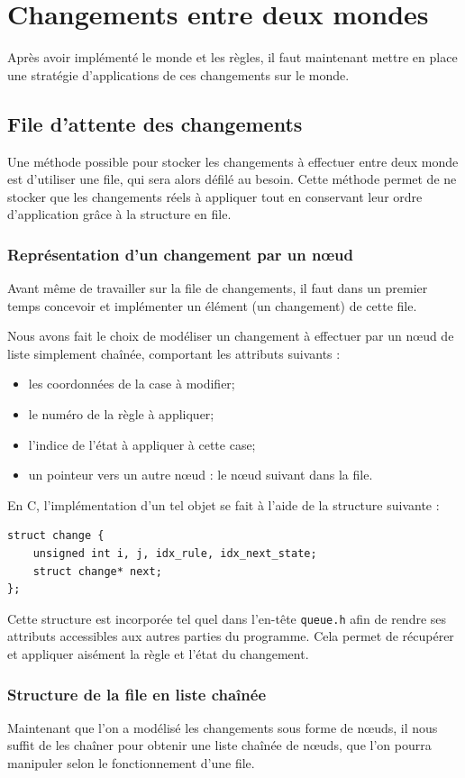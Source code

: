 \chapter{Changements entre deux mondes}
\graphicspath{{img/chap3}}
Après avoir implémenté le monde et les règles, il faut maintenant mettre en place une stratégie d'applications de ces changements sur le monde. 
\section{File d'attente des changements}
Une méthode possible pour stocker les changements à effectuer entre deux monde est d'utiliser une file, qui sera alors défilé au besoin. Cette méthode permet de ne stocker que les changements réels à appliquer tout en conservant leur ordre d'application grâce à la structure en file.

\subsection{Représentation d'un changement par un nœud}
Avant même de travailler sur la file de changements, il faut dans un premier temps concevoir et implémenter un élément (un changement) de cette file.

Nous avons fait le choix de modéliser un changement à effectuer par un nœud de liste simplement chaînée, comportant les attributs suivants :
\begin{itemize}
    \item les coordonnées de la case à modifier;
    \item le numéro de la règle à appliquer;
    \item l'indice de l'état à appliquer à cette case;
    \item un pointeur vers un autre nœud : le nœud suivant dans la file.
\end{itemize}

En C, l'implémentation d'un tel objet se fait à l'aide de la structure suivante :
\begin{lstlisting}
struct change {
    unsigned int i, j, idx_rule, idx_next_state;
    struct change* next;
};
\end{lstlisting}
\label{lst:StructureChangement}
Cette structure est incorporée tel quel dans l'en-tête \texttt{queue.h} afin de rendre ses attributs accessibles aux autres parties du programme. Cela permet de récupérer et appliquer aisément la règle et l'état du changement.

\subsection{Structure de la file en liste chaînée}
Maintenant que l'on a modélisé les changements sous forme de nœuds, il nous suffit de les chaîner pour obtenir une liste chaînée de nœuds, que l'on pourra manipuler selon le fonctionnement d'une file.

